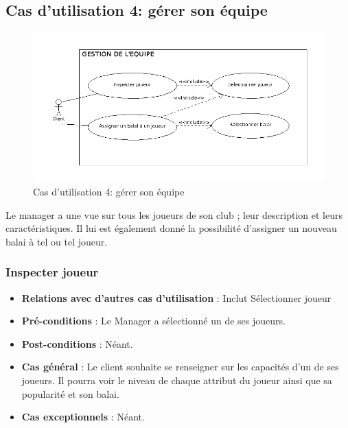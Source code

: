 \documentclass[a4paper,titlepage]{scrreprt}
\begin{document}
  \subsection{Cas d'utilisation 4: gérer son équipe}
  \begin{figure}[H]
    \center
    \includegraphics[scale=0.5]{uml/useCaseView/Gestiondelequipe.png}
    \caption{Cas d'utilisation 4: gérer son équipe}
  \end{figure}	
  Le manager a une vue sur tous les joueurs de son \gls{club} ;  
  leur description et leurs caractéristiques. 
  Il lui est également donné la possibilité d'assigner un nouveau balai à tel ou tel joueur.
    \subsubsection{Inspecter joueur}
      \begin{itemize}
        \item \textbf{Relations avec d'autres cas d'utilisation}  : Inclut Sélectionner joueur
        \item \textbf{Pré-conditions} : Le Manager a sélectionné un de ses joueurs.
        \item \textbf{Post-conditions} : Néant.
        \item \textbf{Cas général} : Le client souhaite se renseigner sur les capacités d’un de ses joueurs. Il pourra voir le niveau de chaque attribut du joueur ainsi que sa popularité et son balai.

        \item \textbf{Cas exceptionnels} : Néant.
      \end{itemize}
\end{document}
